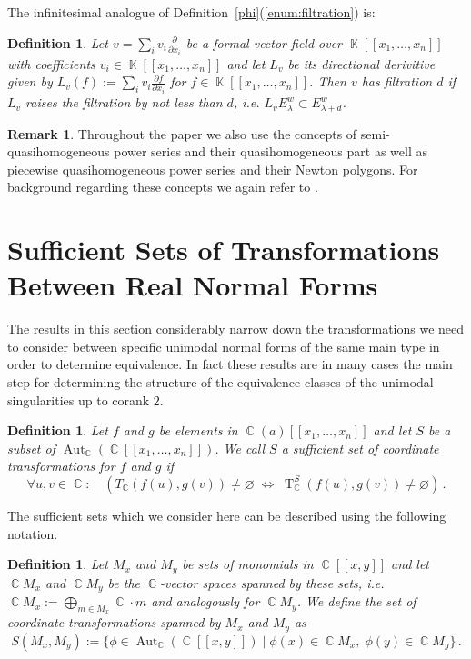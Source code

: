 \documentclass[noend]{amsproc}
\newtheorem{defn}[theorem]{Definition}
\theoremstyle{definition}
\newtheorem{remark}[theorem]{Remark}
\DeclareMathOperator{\C}{\mathbb{C}}
\DeclareMathOperator{\K}{\mathbb{K}}
\DeclareMathOperator{\T}{T}
\DeclareMathOperator{\Aut}{Aut}
\begin{document}
The infinitesimal analogue of Definition~\ref{phi}(\ref{enum:filtration}) is:

\begin{defn}
Let $v = \sum_i v_i \frac{\partial}{\partial x_i}$ be a formal vector field
over $\K[[x_1,\ldots,x_n]]$ with coefficients $v_i \in \K[[x_1,\ldots,x_n]]$
and let $L_v$ be its directional derivitive given by
$L_v(f) := \sum_i v_i \frac{\partial f}{\partial x_i}$ for
$f \in \K[[x_1,\ldots,x_n]]$. Then $v$ has filtration $d$ if $L_v$ raises the
filtration by not less than $d$, i.e.\@
$L_v E^w_\lambda \subset E^w_{\lambda+d}$.
\end{defn}

\begin{remark}
Throughout the paper we also use the concepts of semi-quasi\-homogeneous power
series and their quasihomogeneous part as well as piecewise quasihomogeneous
power series and their Newton polygons. For background regarding these concepts
we again refer to \citet{A1974}.
\end{remark}


\section{Sufficient Sets of Transformations Between Real Normal Forms}

The results in this section considerably narrow down the transformations we
need to consider between specific unimodal normal forms of the same main type
in order to determine equivalence. In fact these results are in many cases the
main step for determining the structure of the equivalence classes of the
unimodal singularities up to corank $2$.

\begin{defn}
Let $f$ and $g$ be elements in $\C(a)[[x_1,\ldots,x_n]]$ and let $S$ be a
subset of $\Aut_{\C}(\C[[x_1,\ldots,x_n]])$. We call $S$ a sufficient set of
coordinate transformations for $f$ and $g$ if
\[
\forall u,v \in \C: \quad
\left(T_{\C}(f(u),g(v)) \neq \varnothing
\;\Leftrightarrow\; \T_{\C}^S(f(u),g(v)) \neq \varnothing\right) \,.
\]
\end{defn}

The sufficient sets which we consider here can be described using the
following notation.

\begin{defn}
Let $M_x$ and $M_y$ be sets of monomials in $\C[[x,y]]$ and let $\C\! M_x$ and
$\C\! M_y$ be the $\C$-vector spaces spanned by these sets, i.e.\@
$\C\! M_x := \bigoplus_{m \in M_x} \C \cdot m$ and analogously for $\C\! M_y$. 
We define the set of coordinate transformations spanned by $M_x$ and $M_y$ as
\[
S(M_x, M_y) := \{ \phi \in \Aut_{\C}(\C[[x,y]]) \mid
\phi(x) \in \C\! M_x,\; \phi(y) \in \C\! M_y \} \,.
\]
\end{defn}
\end{document}
